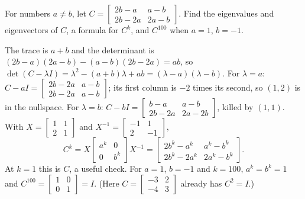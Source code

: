 \begin{exercise}\label{exr:u24-Ck}
For numbers $a\neq b$, let
$C=\left[\begin{smallmatrix} 2b-a & a-b\\ 2b-2a & 2a-b\end{smallmatrix}\right]$. Find the
eigenvalues and eigenvectors of $C$, a formula for $C^{k}$, and $C^{100}$ when $a=1$, $b=-1$.
\end{exercise}
\begin{solution}
The trace is $a+b$ and the determinant is $(2b-a)(2a-b)-(a-b)(2b-2a)=ab$, so
$\det(C-\lambda I)=\lambda^{2}-(a+b)\lambda+ab=(\lambda-a)(\lambda-b)$. For $\lambda=a$:
$C-aI=\left[\begin{smallmatrix} 2b-2a & a-b\\ 2b-2a & a-b\end{smallmatrix}\right]$; its first
column is $-2$ times its second, so $(1,2)$ is in the nullspace. For $\lambda=b$:
$C-bI=\left[\begin{smallmatrix} b-a & a-b\\ 2b-2a & 2a-2b\end{smallmatrix}\right]$, killed by
$(1,1)$. With $X=\left[\begin{smallmatrix} 1&1\\ 2&1\end{smallmatrix}\right]$ and
$X^{-1}=\left[\begin{smallmatrix} -1&1\\ 2&-1\end{smallmatrix}\right]$,
\[
  C^{k}=X\begin{bmatrix} a^{k}&0\\ 0&b^{k}\end{bmatrix}X^{-1}
  =\begin{bmatrix} 2b^{k}-a^{k} & a^{k}-b^{k}\\ 2b^{k}-2a^{k} & 2a^{k}-b^{k}\end{bmatrix}.
\]
At $k=1$ this is $C$, a useful check. For $a=1$, $b=-1$ and $k=100$, $a^{k}=b^{k}=1$ and
$C^{100}=\left[\begin{smallmatrix} 1&0\\ 0&1\end{smallmatrix}\right]=I$. (Here
$C=\left[\begin{smallmatrix} -3&2\\ -4&3\end{smallmatrix}\right]$ already has $C^{2}=I$.)
\end{solution}

